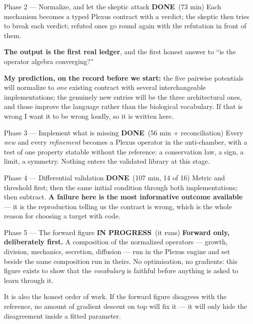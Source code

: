 \documentclass[11pt,a4paper]{article}
\newcommand{\done}{\textcolor{good}{\textbf{DONE}}}
\newcommand{\prog}{\textcolor{warn}{\textbf{IN PROGRESS}}}
\begin{document}
\begin{phasebox}{Phase 2 --- Normalize, and let the skeptic attack \hfill \done\ (73 min)}
Each mechanism becomes a typed Plexus contract with a verdict; the skeptic then tries to break each
verdict; refuted ones go round again with the refutation in front of them.

\textbf{The output is the first real ledger}, and the first honest answer to ``is the operator
algebra converging?''

\textbf{My prediction, on the record before we start:} the five pairwise potentials will normalize
to \emph{one} existing contract with several interchangeable implementations; the genuinely new
entries will be the three architectural ones, and those improve the language rather than the
biological vocabulary. If that is wrong I want it to be wrong loudly, so it is written here.
\end{phasebox}

\begin{phasebox}{Phase 3 --- Implement what is missing \hfill \done\ (56 min + reconciliation)}
Every \emph{new} and every \emph{refinement} becomes a Plexus operator in the anti-chamber, with a
test of one property statable without the reference: a conservation law, a sign, a limit, a
symmetry. Nothing enters the validated library at this stage.
\end{phasebox}

\begin{phasebox}{Phase 4 --- Differential validation \hfill \done\ (107 min, 14 of 16)}
Metric and threshold first; then the same initial condition through both implementations; then
subtract. \textbf{A failure here is the most informative outcome available} --- it is the
reproduction telling us the contract is wrong, which is the whole reason for choosing a target
with code.
\end{phasebox}

\begin{phasebox}{Phase 5 --- The forward figure \hfill \prog\ (it runs)}
\textbf{Forward only, deliberately first.} A composition of the normalized operators --- growth,
division, mechanics, secretion, diffusion --- run in the Plexus engine and set beside the same
composition run in theirs. No optimisation, no gradients: this figure exists to show that the
\emph{vocabulary} is faithful before anything is asked to learn through it.

It is also the honest order of work. If the forward figure disagrees with the reference, no amount
of gradient descent on top will fix it --- it will only hide the disagreement inside a fitted
parameter.
\end{phasebox}
\end{document}

